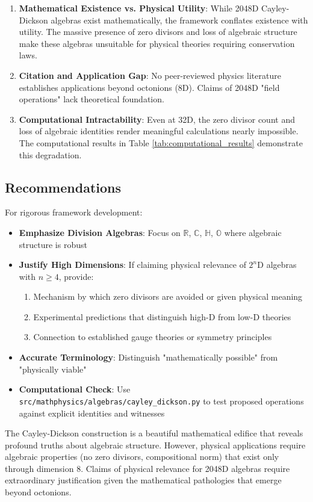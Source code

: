 \begin{enumerate}
    \item \textbf{Mathematical Existence vs. Physical Utility}: While 2048D Cayley-Dickson algebras exist mathematically, the framework conflates existence with utility. The massive presence of zero divisors and loss of algebraic structure make these algebras unsuitable for physical theories requiring conservation laws.

    \item \textbf{Citation and Application Gap}: No peer-reviewed physics literature establishes applications beyond octonions (8D). Claims of 2048D "field operations" lack theoretical foundation.

    \item \textbf{Computational Intractability}: Even at 32D, the zero divisor count and loss of algebraic identities render meaningful calculations nearly impossible. The computational results in Table \ref{tab:computational_results} demonstrate this degradation.
\end{enumerate}

\subsection{Recommendations}

For rigorous framework development:

\begin{itemize}
    \item \textbf{Emphasize Division Algebras}: Focus on $\mathbb{R}$, $\mathbb{C}$, $\mathbb{H}$, $\mathbb{O}$ where algebraic structure is robust

    \item \textbf{Justify High Dimensions}: If claiming physical relevance of $2^n$D algebras with $n \geq 4$, provide:
    \begin{enumerate}
        \item Mechanism by which zero divisors are avoided or given physical meaning
        \item Experimental predictions that distinguish high-D from low-D theories
        \item Connection to established gauge theories or symmetry principles
    \end{enumerate}

    \item \textbf{Accurate Terminology}: Distinguish "mathematically possible" from "physically viable"

    \item \textbf{Computational Check}: Use \texttt{src/mathphysics/algebras/cayley\_dickson.py} to test proposed operations against explicit identities and witnesses
\end{itemize}

The Cayley-Dickson construction is a beautiful mathematical edifice that reveals profound truths about algebraic structure. However, physical applications require algebraic properties (no zero divisors, compositional norm) that exist only through dimension 8. Claims of physical relevance for 2048D algebras require extraordinary justification given the mathematical pathologies that emerge beyond octonions.
